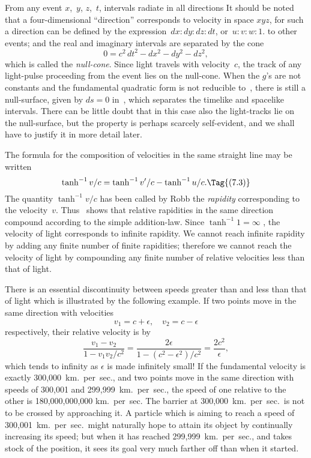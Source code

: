 \documentclass[12pt]{book}
\begin{document}
From any event $x$,~$y$, $z$,~$t$, intervals radiate in all directions\footnotemark\footnotetext
  {It should be noted that a four\hyp{}dimensional ``direction'' corresponds to velocity
   in space $xyz$, for such a direction can be defined by the expression~$dx:dy:dz:dt$, or~$u:v:w:1$.}
to other events;
and the real and imaginary intervals are separated by the cone
\[
0 = c^2\, dt^{2} - dx^{2} - dy^{2} - dz^{2},
\]
which is called the \emph{null-cone}. Since light travels with velocity~$c$, the track of
%
any light-pulse proceeding from the event lies on the null-cone. When the
$g$'s are not constants and the fundamental quadratic form is not reducible to~,
there is still a null\hyp{}surface, given by $ds = 0$ in~, which separates the
timelike and spacelike intervals. There can be little doubt that in this case
also the light-tracks lie on the null\hyp{}surface, but the property is perhaps scarcely
self\hyp{}evident, and we shall have to justify it in more detail later.

The formula  for the composition of velocities in the same straight
%
%
line may be written
\[
\tanh^{-1} v/c = \tanh^{-1} v'/c - \tanh^{-1} u/c.
\Tag{(7.3)}
\]
The quantity $\tanh^{-1} v/c$ has been called by Robb the \emph{rapidity} corresponding
%
to the velocity~$v$. Thus ~shows that relative rapidities in the same direction
compound according to the simple addition\hyp{}law. Since $\tanh^{-1} 1 = \infty$ , the
velocity of light corresponds to infinite rapidity. We cannot reach infinite
rapidity by adding any finite number of finite rapidities; therefore we cannot
reach the velocity of light by compounding any finite number of relative
velocities less than that of light.

There is an essential discontinuity between speeds greater than and less
than that of light which is illustrated by the following example. If two points
%
move in the same direction with velocities
\[
v_{1} = c + \epsilon,\quad
v_{2} = c - \epsilon
\]
respectively, their relative velocity is by~
\[
\frac{v_{1} - v_{2}}{1 - v_{1}v_{2}/c^2}
= \frac{2\epsilon}{1 - (c^2 - \epsilon^{2})/c^2}
= \frac{2c^2}{\epsilon},
\]
which tends to infinity as $\epsilon$ is made infinitely small! If the fundamental
velocity is exactly 300,000~km.\ per~sec., and two points move in the same
direction with speeds of 300,001 and 299,999~km.\ per~sec., the speed of one
relative to the other is 180,000,000,000 km.\ per~sec. The barrier at 300,000~km.\
per~sec.\ is not to be crossed by approaching it. A particle which is aiming to
reach a speed of 300,001~km.\ per~sec.\ might naturally hope to attain its object
by continually increasing its speed; but when it has reached 299,999~km.\ per~sec.,
and takes stock of the position, it sees its goal very much farther off than
when it started.
\end{document}
